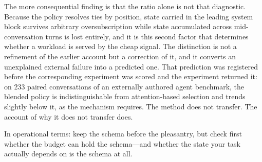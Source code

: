 The more consequential finding is that the ratio alone is not that diagnostic.
Because the policy resolves ties by position, state carried in the leading system
block survives arbitrary oversubscription while state accumulated across
mid-conversation turns is lost entirely, and it is this second factor that
determines whether a workload is served by the cheap signal.  The distinction is
not a refinement of the earlier account but a correction of it, and it converts
an unexplained external failure into a predicted one.  That prediction was
registered before the corresponding experiment was scored and the experiment
returned it: on 233 paired conversations of an externally authored agent
benchmark, the blended policy is indistinguishable from attention-based
selection and trends slightly below it, as the mechanism requires.  The method
does not transfer.  The account of why it does not transfer does.

In operational terms: keep the schema before the pleasantry, but check first
whether the budget can hold the schema---and whether the state your task
actually depends on is the schema at all.

